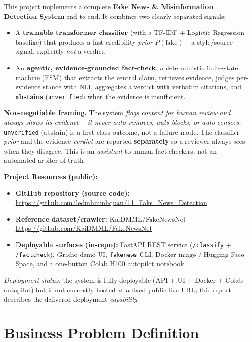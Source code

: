 \documentclass[12pt,a4paper]{article}
\begin{document}
This project implements a complete \textbf{Fake News \& Misinformation Detection System} end-to-end. It combines two clearly separated signals:

\begin{itemize}
  \item A \textbf{trainable transformer classifier} (with a TF-IDF + Logistic Regression baseline) that produces a fast credibility \emph{prior} $P(\text{fake})$ -- a style/source signal, explicitly \emph{not} a verdict.
  \item An \textbf{agentic, evidence-grounded fact-check}: a deterministic finite-state machine (FSM) that extracts the central claim, retrieves evidence, judges per-evidence stance with NLI, aggregates a verdict with verbatim citations, and \textbf{abstains} (\texttt{unverified}) when the evidence is insufficient.
\end{itemize}

\textbf{Non-negotiable framing.} The system \emph{flags content for human review and always shows its evidence -- it never auto-removes, auto-blocks, or auto-censors.} \texttt{unverified} (abstain) is a first-class outcome, not a failure mode. The classifier \emph{prior} and the evidence \emph{verdict} are reported \textbf{separately} so a reviewer always sees when they disagree. This is an \emph{assistant} to human fact-checkers, not an automated arbiter of truth.

\textbf{Project Resources (public):}
\begin{itemize}\setlength\itemsep{0.15em}
  \item \textbf{GitHub repository (source code):} \url{https://github.com/ledinhminhquan/11_Fake_News_Detection}
  \item \textbf{Reference dataset/crawler:} KaiDMML/FakeNewsNet -- \url{https://github.com/KaiDMML/FakeNewsNet}
  \item \textbf{Deployable surfaces (in-repo):} FastAPI REST service (\texttt{/classify} + \texttt{/factcheck}), Gradio demo UI, \texttt{fakenews} CLI, Docker image / Hugging Face Space, and a one-button Colab H100 autopilot notebook.
\end{itemize}

\textit{Deployment status:} the system is fully deployable (API + UI + Docker + Colab autopilot) but is not currently hosted at a fixed public live URL; this report describes the delivered deployment \emph{capability}.

\section{Business Problem Definition}
\end{document}
